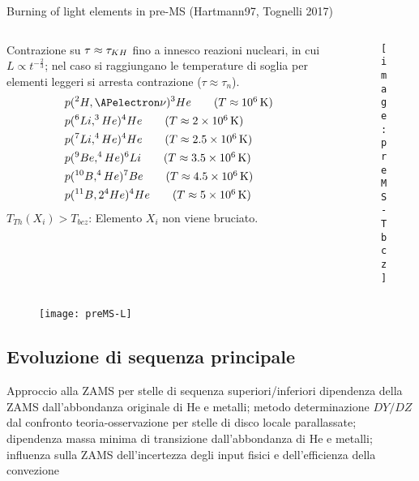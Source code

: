 \begin{frame}{Burning of light elements in pre-MS (Hartmann97, Tognelli 2017)}
    \begin{columns}[T]
        \begin{column}{0.5\textwidth}
    Contrazione su $\tau\approx\tau_{KH}{}$ fino a innesco reazioni nucleari, in cui $L\propto t^{-\frac{2}{3}}$; nel caso si raggiungano le temperature di soglia per elementi leggeri si arresta contrazione ($\tau\approx\tau_n$).
            \begin{align*}
                &p(^2H,\APelectron\nu)^3He\tag{$T\approx\SI{e6}{\kelvin}$}\\
                &p(^6Li,^3He)^4He\tag{$T\approx\SI{2e6}{\kelvin}$}\\
                &p(^7Li,^4He)^4He\tag{$T\approx\SI{2.5e6}{\kelvin}$}\\
                &p(^9Be,^4He)^6Li\tag{$T\approx\SI{3.5e6}{\kelvin}$}\\
                &p(^{10}B,^4He)^7Be\tag{$T\approx\SI{4.5e6}{\kelvin}$}\\
                &p(^{11}B,2 ^4He)^4He\tag{$T\approx\SI{5e6}{\kelvin}$}
            \end{align*}
            $T_{Th}(X_i)>T_{bcz}$: Elemento $X_i$ non viene bruciato.
        \end{column}
        \begin{column}{0.5\textwidth}
			\begin{figure}[!ht]
                \texttt{[image: preMS-Tbcz]}\label{fig:preMS-Tbcz}
			\end{figure}
        \end{column}
    \end{columns}
    
			\begin{figure}[!ht]
                \texttt{[image: preMS-L]}\label{fig:preMS-L}
			\end{figure}
\end{frame}

\subsection{Evoluzione di sequenza principale}

\begin{frame}{Approccio alla ZAMS per stelle di sequenza superiori/inferiori}
dipendenza della ZAMS dall'abbondanza originale di He e metalli; metodo determinazione $DY/DZ$ dal confronto teoria-osservazione per stelle di disco locale parallassate; dipendenza massa minima di transizione dall'abbondanza di He e metalli; influenza sulla ZAMS dell'incertezza degli input fisici e dell'efficienza della convezione
\end{frame}

